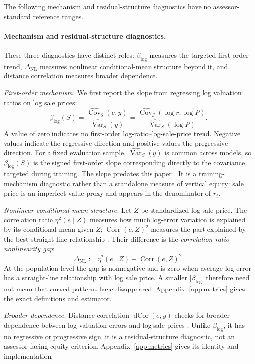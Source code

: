 \documentclass[10pt]{article}
\theoremstyle{definition}
\newcommand{\Corr}{\operatorname{Corr}}
\newcommand{\1}{\mathbf{1}}
\begin{document}
The following mechanism and residual-structure diagnostics have no assessor-standard reference ranges.


\paragraph{
Mechanism and residual-structure diagnostics.}
{These three diagnostics have distinct roles: $\beta_{\log}$ measures the targeted
first-order trend, $\Delta_{\mathrm{NL}}$ measures nonlinear conditional-mean
structure beyond it, and distance correlation measures broader dependence.

\emph{First-order mechanism.}
We first report the slope from regressing log valuation ratios on log sale prices:
\begin{equation}
\label{eq:log_ratio_slope}
\beta_{\log}(S)
=
\frac{
\widehat{\operatorname{Cov}}_S(e,y)
}{
\widehat{\operatorname{Var}}_S(y)
}
=
\frac{
\widehat{\operatorname{Cov}}_S(\log r,\log P)
}{
\widehat{\operatorname{Var}}_S(\log P)
}.
\end{equation}
A value of zero indicates no first-order log-ratio--log-sale-price trend. Negative
values indicate the regressive direction and positive values the progressive
direction. For a fixed evaluation sample, $\widehat{\operatorname{Var}}_S(y)$ is
common across models, so $\beta_{\log}(S)$ is the signed first-order slope
corresponding directly to the covariance targeted during training.
The slope predates this paper \cite{Cheng1974}. It is a training-mechanism
diagnostic rather than a standalone measure of vertical equity: sale price is
an imperfect value proxy and appears in the denominator of $r_i$.

\emph{Nonlinear conditional-mean structure.}
Let $Z$ be standardized log sale price. The correlation ratio $\eta^2(e\mid Z)$ measures how much log-error variation is explained by its conditional mean given $Z$; $\Corr(e,Z)^2$ measures the part explained by the best straight-line relationship \cite{DoksumSamarov1995}. Their difference is the \emph{correlation-ratio nonlinearity gap}:
\begin{equation}
\label{eq:nonlinearity_gap}
\Delta_{\mathrm{NL}}
:=
\eta^2(e\mid Z)-\Corr(e,Z)^2.
\end{equation}
At the population level the gap is nonnegative and is zero when average log error has a straight-line relationship with log sale price. A smaller $\lvert\beta_{\log}\rvert$ therefore need not mean that curved patterns have disappeared. Appendix~\ref{app:metrics} gives the exact definitions and estimator.

\emph{Broader dependence.}
Distance correlation $\operatorname{dCor}(e,y)$ checks for broader dependence between log valuation errors and log sale prices \cite{SzekelyRizzoBakirov2007}. Unlike $\beta_{\log}$, it has no regressive or progressive sign; it is a residual-structure diagnostic, not an assessor-facing equity criterion. Appendix~\ref{app:metrics} gives its identity and implementation.
}
\end{document}
